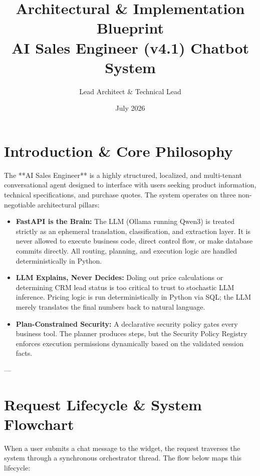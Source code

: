 \documentclass[11pt,a4paper]{article}
\title{\textbf{Architectural \& Implementation Blueprint \\ AI Sales Engineer (v4.1) Chatbot System}}
\author{Lead Architect \& Technical Lead}
\date{July 2026}
\begin{document}
\maketitle
\tableofcontents
\newpage

\section{Introduction \& Core Philosophy}

The **AI Sales Engineer** is a highly structured, localized, and multi-tenant conversational agent designed to interface with users seeking product information, technical specifications, and purchase quotes. The system operates on three non-negotiable architectural pillars:

\begin{itemize}
    \item \textbf{FastAPI is the Brain:} The LLM (Ollama running Qwen3) is treated strictly as an ephemeral translation, classification, and extraction layer. It is never allowed to execute business code, direct control flow, or make database commits directly. All routing, planning, and execution logic are handled deterministically in Python.
    \item \textbf{LLM Explains, Never Decides:} Doling out price calculations or determining CRM lead status is too critical to trust to stochastic LLM inference. Pricing logic is run deterministically in Python via SQL; the LLM merely translates the final numbers back to natural language.
    \item \textbf{Plan-Constrained Security:} A declarative security policy gates every business tool. The planner produces steps, but the Security Policy Registry enforces execution permissions dynamically based on the validated session facts.
\end{itemize}

---

\section{Request Lifecycle \& System Flowchart}

When a user submits a chat message to the widget, the request traverses the system through a synchronous orchestrator thread. The flow below maps this lifecycle:
\end{document}
